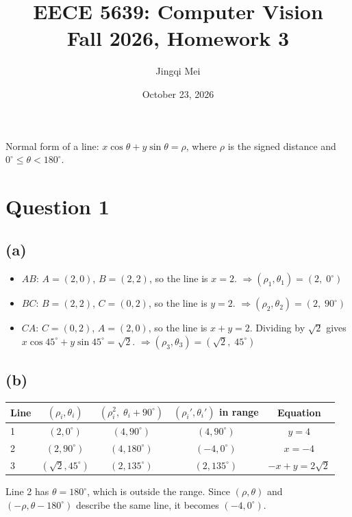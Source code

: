 \documentclass[11pt]{article}
\title{EECE 5639: Computer Vision\\Fall 2026, Homework 3}
\author{Jingqi Mei}
\date{October 23, 2026}
\begin{document}
\maketitle

Normal form of a line: $x\cos\theta + y\sin\theta = \rho$, where $\rho$ is the signed distance and $0^\circ\le\theta<180^\circ$.

\section*{Question 1}
\subsection*{(a)}
\begin{itemize}[leftmargin=*]
\item $AB$: $A=(2,0)$, $B=(2,2)$, so the line is $x=2$. \quad $\Rightarrow (\rho_1,\theta_1) = (2,\;0^\circ)$
\item $BC$: $B=(2,2)$, $C=(0,2)$, so the line is $y=2$. \quad $\Rightarrow (\rho_2,\theta_2) = (2,\;90^\circ)$
\item $CA$: $C=(0,2)$, $A=(2,0)$, so the line is $x+y=2$. Dividing by $\sqrt2$ gives $x\cos45^\circ+y\sin45^\circ=\sqrt2$. \quad $\Rightarrow (\rho_3,\theta_3) = (\sqrt2,\;45^\circ)$
\end{itemize}

\subsection*{(b)}
\begin{center}
\begin{tabular}{lcccc}\toprule
Line & $(\rho_i,\theta_i)$ & $(\rho_i^2,\;\theta_i+90^\circ)$ & $(\rho_i',\theta_i')$ in range & Equation\\\midrule
1 & $(2,0^\circ)$ & $(4,90^\circ)$ & $(4,90^\circ)$ & $y=4$\\
2 & $(2,90^\circ)$ & $(4,180^\circ)$ & $(-4,0^\circ)$ & $x=-4$\\
3 & $(\sqrt2,45^\circ)$ & $(2,135^\circ)$ & $(2,135^\circ)$ & $-x+y=2\sqrt2$\\\bottomrule
\end{tabular}
\end{center}
Line 2 has $\theta=180^\circ$, which is outside the range. Since $(\rho,\theta)$ and $(-\rho,\theta-180^\circ)$ describe the same line, it becomes $(-4,0^\circ)$.
\end{document}

